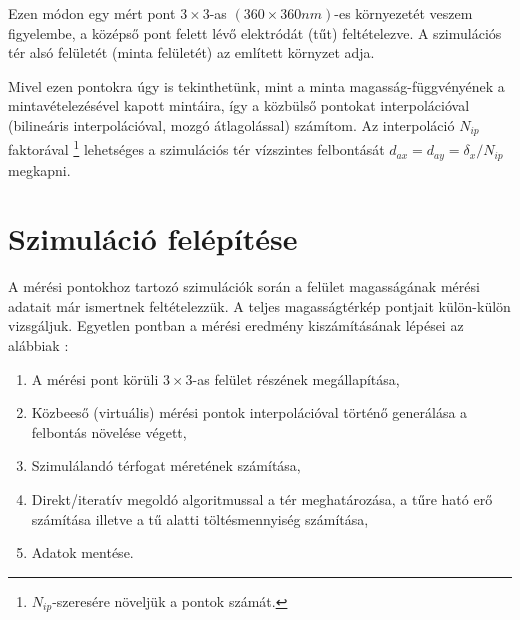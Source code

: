 	Ezen módon egy mért pont $3\times3$-as $(360\times360 nm)$-es környezetét veszem figyelembe,
	a középső pont felett lévő elektródát (tűt) feltételezve.
	A szimulációs tér alsó felületét (minta felületét) az említett környzet adja.
	
	Mivel ezen pontokra úgy is tekinthetünk, mint a minta magasság-függvényének a mintavételezésével
	kapott mintáira, így a közbülső pontokat interpolációval (bilineáris interpolációval, mozgó átlagolással) számítom.
	Az interpoláció $N_{ip}$ faktorával \footnote{$N_{ip}$-szeresére növeljük a pontok számát.}
	lehetséges a szimulációs tér vízszintes felbontását $d_{ax}=d_{ay} = \delta_x / N_{ip}$ megkapni.
	
\section{Szimuláció felépítése} \label{sec:sim_felepites}

	A mérési pontokhoz tartozó szimulációk során a felület magasságának mérési adatait már ismertnek feltételezzük.
	A teljes magasságtérkép pontjait külön-külön vizsgáljuk.
	Egyetlen pontban a mérési eredmény kiszámításának lépései az alábbiak :
	\begin{enumerate}
		\item A mérési pont körüli $3\times3$-as felület részének megállapítása,
		\item Közbeeső (virtuális) mérési pontok interpolációval történő generálása a felbontás növelése végett,
		\item Szimulálandó térfogat méretének számítása,
		\item Direkt/iteratív megoldó algoritmussal a tér meghatározása, 
				a tűre ható erő számítása illetve a tű alatti töltésmennyiség számítása,
		\item Adatok mentése.
	\end{enumerate}
	

	